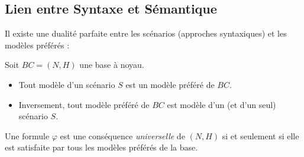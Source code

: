 \subsection{Lien entre Syntaxe et Sémantique}

Il existe une dualité parfaite entre les scénarios (approches syntaxiques) et les modèles préférés :

\begin{theorem}
    Soit $BC = (N, H)$ une base à noyau.
    \begin{itemize}
        \item Tout modèle d'un scénario $S$ est un modèle préféré de $BC$.
        \item Inversement, tout modèle préféré de $BC$ est modèle d'un (et d'un seul) scénario $S$.
    \end{itemize}
\end{theorem}

\begin{remark}
    Une formule $\varphi$ est une conséquence \emph{universelle} de $(N, H)$ si et seulement si elle est satisfaite 
    par tous les modèles préférés de la base.
\end{remark}